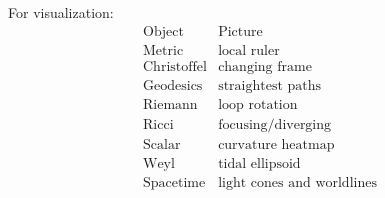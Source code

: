 \documentclass[12pt,a4paper]{article}
\theoremstyle{notespace}
\begin{document}
For visualization:
\[
\begin{array}{c|c}
	\text{Object} & \text{Picture}\\
	\hline
	\text{Metric} & \text{local ruler}\\
	\text{Christoffel} & \text{changing frame}\\
	\text{Geodesics} & \text{straightest paths}\\
	\text{Riemann} & \text{loop rotation}\\
	\text{Ricci} & \text{focusing/diverging}\\
	\text{Scalar} & \text{curvature heatmap}\\
	\text{Weyl} & \text{tidal ellipsoid}\\
	\text{Spacetime} & \text{light cones and worldlines}
\end{array}
\]
\end{document}
